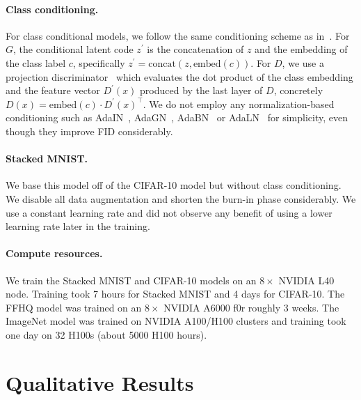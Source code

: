 \paragraph{Class conditioning.}
For class conditional models, we follow the same conditioning scheme as in~\cite{sg2ada}. For $G$, the conditional latent code $z^\prime$ is the concatenation of $z$ and the embedding of the class label $c$, specifically $z^\prime=\text{concat}(z,\text{embed}(c))$. For $D$, we use a projection discriminator~\cite{cgans} which evaluates the dot product of the class embedding and the feature vector $D^\prime(x)$ produced by the last layer of $D$, concretely $D(x)=\text{embed}(c)\cdot D^\prime(x)^\top$. We do not employ any normalization-based conditioning such as AdaIN~\cite{sg1}, AdaGN~\cite{adm,edm}, AdaBN~\cite{biggan} or AdaLN~\cite{dit} for simplicity, even though they improve FID considerably.

\vspace{-0.1cm}
\paragraph{Stacked MNIST.}
We base this model off of the CIFAR-10 model but without class conditioning. We disable all data augmentation and shorten the burn-in phase considerably. We use a constant learning rate and did not observe any benefit of using a lower learning rate later in the training.

\vspace{-0.1cm}
\paragraph{Compute resources.}
We train the Stacked MNIST and CIFAR-10 models on an $8\times$ NVIDIA L40 node. Training took 7 hours for Stacked MNIST and 4 days for CIFAR-10. The FFHQ model was trained on an $8\times$ NVIDIA A6000 f0r roughly 3 weeks. The ImageNet model was trained on NVIDIA A100/H100 clusters and training took one day on 32 H100s (about 5000 H100 hours).



\section{Qualitative Results}



